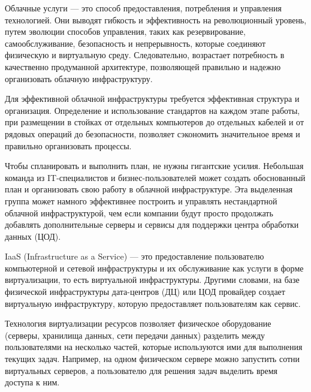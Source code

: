 Облачные услуги --- это способ предоставления, потребления и управления технологией.
Они выводят гибкость и эффективность на революционный уровень, путем эволюции способов управления, таких как резервирование, самообслуживание, безопасность и непрерывность, которые соединяют физическую и виртуальную среду.
Следовательно, возрастает потребность в качественно продуманной архитектуре, позволяющей правильно и надежно организовать облачную инфраструктуру.

Для эффективной облачной инфраструктуры требуется эффективная структура и организация.
Определение и использование стандартов на каждом этапе работы, при размещении в стойках от отдельных компьютеров до отдельных кабелей и от рядовых операций до безопасности, позволяет сэкономить значительное время и правильно организовать процессы.

Чтобы спланировать и выполнить план, не нужны гигантские усилия.
Небольшая команда из IT-специалистов и бизнес-пользователей может создать обоснованный план и организовать свою работу в облачной инфраструктуре.
Эта выделенная группа может намного эффективнее построить и управлять нестандартной облачной инфраструктурой, чем если компании будут просто продолжать добавлять дополнительные серверы и сервисы для поддержки центра обработки данных (ЦОД).

IaaS (Infrastructure as a Service) --- это предоставление пользователю компьютерной и сетевой инфраструктуры и их обслуживание как услуги в форме виртуализации, то есть виртуальной инфраструктуры.
Другими словами, на базе физической инфраструктуры дата-центров (ДЦ) или ЦОД провайдер создает виртуальную инфраструктуру, которую предоставляет пользователям как сервис.

Технология виртуализации ресурсов позволяет физическое оборудование (серверы, хранилища данных, сети передачи данных) разделить между пользователями на несколько частей, которые используются ими для выполнения текущих задач.
Например, на одном физическом сервере можно запустить сотни виртуальных серверов, а пользователю для решения задач выделить время доступа к ним.

\clearpage
